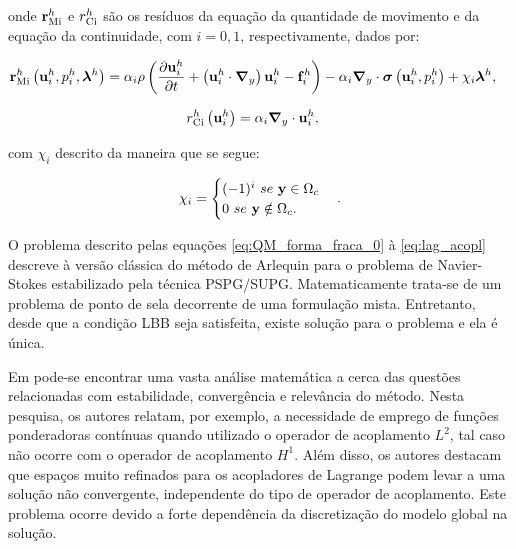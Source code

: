 \noindent onde $\mathbf{r}_{\mathrm{Mi}}^{h}$ e ${r_{\mathrm{Ci}}^{h}}$ são os resíduos da equação da quantidade de movimento e da equação da continuidade, com $i=0,1$, respectivamente, dados por:

\begin{align}
	\mathbf{r}_{\mathrm{Mi}}^{h} \left(\mathbf{u}_i^{h},p_i^{h},\boldsymbol{\lambda}^h \right)&=\alpha_i \rho\left(\frac{\partial\mathbf{u}_i^{h}}{\partial t}+ \left( \mathbf{u}_i^{h} \cdot \boldsymbol{\nabla}_y \right) \mathbf{u}_i^{h} - \mathbf{f}_i^{h}\right) - \alpha_i \boldsymbol{\nabla}_y \cdot \boldsymbol{\sigma}\left(\mathbf{u}_i^{h},p_i^{h}\right)+ \chi_{i} \boldsymbol{\lambda}^h \label{eq:res_QM_i},
\end{align}

\noindent

\begin{align}
	r_{\mathrm{Ci}}^{h}\left(\mathbf{u}_i^{h}\right)&= \alpha_i \boldsymbol{\nabla}_y \cdot \mathbf{u}_i^{h} \label{eq:res_C_i}, 
\end{align}

\noindent com $\chi_{i}$ descrito da maneira que se segue:

\begin{align}
	\chi_{i} = \begin{cases} (-1)^{i} \ se \ \mathbf{y} \in \Omega_c \\
			   0 \ se \ \mathbf{y} \notin \Omega_c. \end{cases}						. 
\end{align}

O problema descrito pelas equações \ref{eq:QM_forma_fraca_0} à \ref{eq:lag_acopl} descreve à versão clássica do método de Arlequin para o problema de Navier-Stokes estabilizado pela técnica PSPG/SUPG. Matematicamente trata-se de um problema de ponto de sela decorrente de uma formulação mista. Entretanto, desde que a condição LBB seja satisfeita, existe solução para o problema e ela é única. 

Em  pode-se encontrar uma vasta análise matemática a cerca das questões relacionadas com estabilidade, convergência e relevância do método. Nesta pesquisa, os autores relatam, por exemplo, a necessidade de emprego de funções ponderadoras contínuas quando utilizado o operador de acoplamento $L^{2}$, tal caso não ocorre com o operador de acoplamento $H^{1}$. Além disso,  os autores destacam que espaços muito refinados para os acopladores de Lagrange podem levar a uma solução não convergente, independente do tipo de operador de acoplamento. Este problema ocorre devido a forte dependência da discretização do modelo global na solução.

